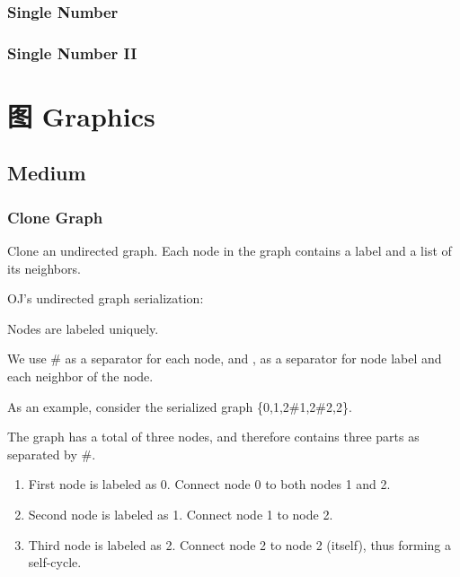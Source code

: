 \documentclass[11pt]{book}
\begin{document}
\subsection{Single Number}
\label{sec-17-2-2}
\subsection{Single Number II}
\label{sec-17-2-3}
\chapter{图 Graphics}
\label{sec-18}
\section{Medium}
\label{sec-18-1}
\subsection{Clone Graph}
\label{sec-18-1-1}
Clone an undirected graph. Each node in the graph contains a label and a list of its neighbors.

OJ's undirected graph serialization:

Nodes are labeled uniquely.

We use \# as a separator for each node, and , as a separator for node label and each neighbor of the node.

As an example, consider the serialized graph \{0,1,2\#1,2\#2,2\}.

The graph has a total of three nodes, and therefore contains three parts as separated by \#.

\begin{enumerate}
\item First node is labeled as 0. Connect node 0 to both nodes 1 and 2.
\item Second node is labeled as 1. Connect node 1 to node 2.
\item Third node is labeled as 2. Connect node 2 to node 2 (itself), thus forming a self-cycle.
\end{enumerate}
\end{document}
